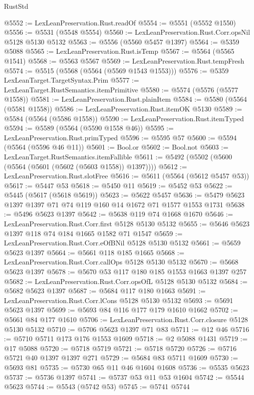 \begin{lexlean}{RustStd}
\begin{coremodule}
@5552 := LexLeanPreservation.Rust.readOf
@5554 := @5551 (@5552 @1550)
@5556 := @5531 (@5548 @5554)
@5560 := LexLeanPreservation.Rust.Corr.opsNil @5128 @5130 @5132
@5563 := @5556 (@5560 @5457 @1397)
@5564 := @5359 @5088
@5565 := LexLeanPreservation.Rust.isTemp
@5567 := @5564 (@5565 @1541)
@5568 := @5563 @5567
@5569 := LexLeanPreservation.Rust.tempFresh
@5574 := @5515 (@5568 (@5564 (@5569 @1543 @1553)))
@5576 := @5359 LexLeanTarget.TargetSyntax.Prim
@5577 := LexLeanTarget.RustSemantics.itemPrimitive
@5580 := @5574 (@5576 (@5577 @1558))
@5581 := LexLeanPreservation.Rust.plainItem
@5584 := @5580 (@5564 (@5581 @1558))
@5586 := LexLeanPreservation.Rust.itemOK @5130
@5589 := @5584 (@5564 (@5586 @1558))
@5590 := LexLeanPreservation.Rust.itemTyped
@5594 := @5589 (@5564 (@5590 @1558 @46))
@5595 := LexLeanPreservation.Rust.primTyped
@5596 := @5595 @57
@5600 := @5594 (@5564 (@5596 @46 @11))
@5601 := Bool.or
@5602 := Bool.not
@5603 := LexLeanTarget.RustSemantics.itemFallible
@5611 := @5492 (@5502 (@5600 (@5564 (@5601 (@5602 (@5603 @1558)) @1397))))
@5612 := LexLeanPreservation.Rust.slotFree
@5616 := @5611 (@5564 (@5612 @5457 @53))
@5617 := @5447 @53
@5618 := @5450 @11
@5619 := @5452 @53
@5622 := @5445 (@5617 (@5618 @5619))
@5623 := @5622 @5457
@5636 := @5479 @5623 @1397 @1397 @71 @74 @119 @160 @14 @1672 @71 @1577 @1553 @1731
@5638 := @5496 @5623 @1397
@5642 := @5638 @119 @74 @1668 @1670
@5646 := LexLeanPreservation.Rust.Corr.first @5128 @5130 @5132
@5655 := @5646 @5623 @1397 @118 @74 @184 @1665 @1582 @71 @1547
@5659 := LexLeanPreservation.Rust.Corr.eOfBNil @5128 @5130 @5132
@5661 := @5659 @5623 @1397
@5664 := @5661 @118 @185 @1665
@5668 := LexLeanPreservation.Rust.Corr.callOps @5128 @5130 @5132
@5670 := @5668 @5623 @1397
@5678 := @5670 @53 @117 @180 @185 @1553 @1663 @1397 @257
@5682 := LexLeanPreservation.Rust.Corr.opsOfL @5128 @5130 @5132
@5684 := @5682 @5623 @1397
@5687 := @5684 @117 @180 @1663
@5691 := LexLeanPreservation.Rust.Corr.lCons @5128 @5130 @5132
@5693 := @5691 @5623 @1397
@5699 := @5693 @84 @116 @177 @179 @1610 @1662
@5702 := @5661 @84 @177 @1610
@5706 := LexLeanPreservation.Rust.Corr.closure @5128 @5130 @5132
@5710 := @5706 @5623 @1397 @71 @83
@5711 := @12 @46
@5716 := @5710 @5711 @173 @176 @1553 @1609
@5718 := @2 @5088 @1431
@5719 := @17 @5088
@5720 := @5718 @5719
@5721 := @5718 @5720
@5726 := @5716 @5721 @40 @1397 @1397 @271
@5729 := @5684 @83 @5711 @1609
@5730 := @5693 @81
@5735 := @5730 @65 @11 @46 @1604 @1608
@5736 := @5535 @5623
@5737 := @5736 @1397
@5741 := @5737 @53 @11 @53 @1604
@5742 := @5544 @5623
@5744 := @5543 (@5742 @53)
@5745 := @5741 @5744

\end{coremodule}
\end{lexlean}
